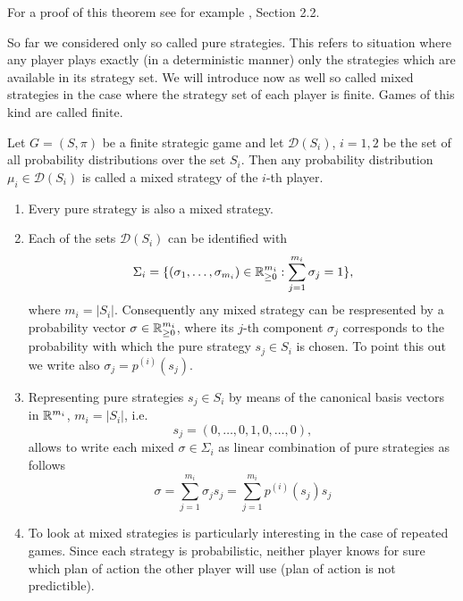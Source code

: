 For a proof of this theorem see for example \cite{gonzalez2010introductory}, Section 2.2.

So far we considered only so called pure strategies. This refers to situation where any player plays exactly (in a deterministic manner) only the strategies which 
are available in its strategy set. We will introduce now as well so called mixed strategies in the case where the strategy set of each player is finite. Games of this
kind are called finite.

\begin{definition}
    Let $G = (S, \pi)$ be a finite strategic game and let $\mathcal{D}(S_{i})$, $i = 1, 2$ be the set of all probability distributions over the set $S_{i}$. Then any probability
    distribution $\mu_{i}\in\mathcal{D}(S_{i})$ is called a mixed strategy of the $i$-th player.
\end{definition}

\begin{remark}
    \begin{enumerate}
        \item Every pure strategy is also a mixed strategy.
        \item Each of the sets $\mathcal{D}(S_{i})$ can be identified with
            \begin{equation*}
                \Sigma_{i} = \{(\sigma_{1}, \ldots, \sigma_{m_{i}})\in\mathbb{R}_{\geq0}^{m_{i}} : \sum_{j = 1}^{m_{i}}\sigma_{j} = 1\},
            \end{equation*}
            where $m_{i} = |S_{i}|$. Consequently any mixed strategy can be respresented by a probability vector $\sigma\in\mathbb{R}_{\geq0}^{m_{i}}$, where
            its $j$-th component $\sigma_{j}$ corresponds to the probability with which the pure strategy $s_{j}\in S_{i}$ is chosen. To point this
            out we write also $\sigma_{j} = p^{(i)}(s_{j})$.
        \item Representing pure strategies $s_{j}\in S_{i}$ by means of the canonical basis vectors in $\mathbb{R}^{m_{i}}$, $m_{i} = |S_{i}|$, i.e.
            \begin{equation*}
                s_{j} = (0, \ldots, 0, 1, 0, \ldots, 0),
            \end{equation*}
            allows to write each mixed $\sigma\in\Sigma_{i}$ as linear combination of pure strategies as follows
            \begin{equation*}
                \sigma = \sum_{j = 1}^{m_{i}}\sigma_{j}s_{j} = \sum_{j = 1}^{m_{i}}p^{(i)}(s_{j})s_{j}
            \end{equation*}
        \item To look at mixed strategies is particularly interesting in the case of repeated games. Since each strategy is probabilistic, neither player knows
            for sure which plan of action the other player will use (plan of action is not predictible). 
    \end{enumerate}
\end{remark}

